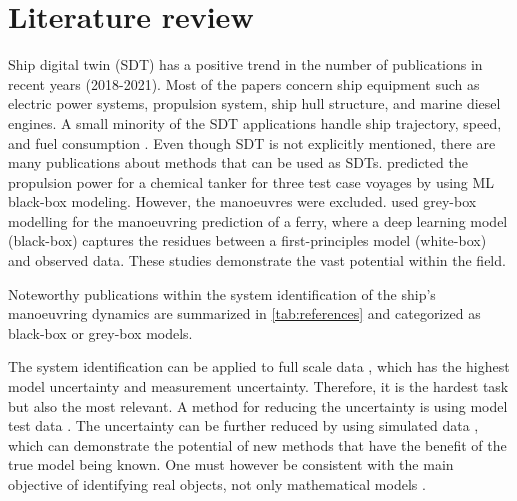 %    
%
%
%

\section{Literature review}
Ship digital twin (SDT) has a positive trend in the number of publications in recent years (2018-2021). Most of the papers concern ship equipment such as electric power systems, propulsion system, ship hull structure, and marine diesel engines. A small minority of the SDT applications handle ship trajectory, speed, and fuel consumption \cite{assani_ships_2022}.   
Even though SDT is not explicitly mentioned, there are many publications about methods that can be used as SDTs. \textcite{lang_comparison_2022} predicted the propulsion power for a chemical tanker for three test case voyages by using ML black-box modeling. However, the manoeuvres were excluded. \textcite{nielsen_machine_2022} used grey-box modelling for the manoeuvring prediction of a ferry, where a deep learning model (black-box) captures the residues between a first-principles model (white-box) and observed data. These studies demonstrate the vast potential within the field.

Noteworthy publications within the system identification of the ship's manoeuvring dynamics are summarized in \autoref{tab:references} and categorized as black-box or grey-box models.
 
The system identification can be applied to full scale data \cite{astrom_identification_1976,revestido_herrero_two-step_2012,perera_system_2015}, which has the highest model uncertainty and measurement uncertainty. Therefore, it is the hardest task but also the most relevant. A method for reducing the uncertainty is using model test data \cite{araki_estimating_2012,luo_parameter_2016,xue_identification_2021,miller_ship_2021, he_nonparametric_2022}. The uncertainty can be further reduced by using simulated data \cite{shi_identification_2009,zhu_parameter_2017,wang_parameter_2021}, which can demonstrate the potential of new methods that have the benefit of the true model being known. One must however be consistent with the main objective of identifying real objects, not only mathematical models \cite{miller_ship_2021}.


